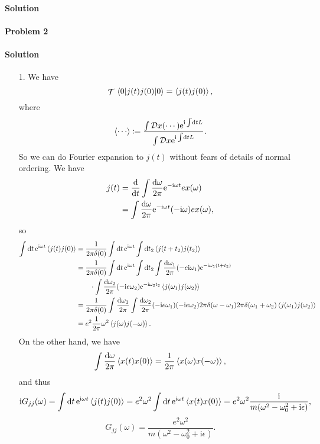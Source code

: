 \documentclass[hyperref, a4paper]{article}
\DeclareMathOperator{\timeorder}{\mathcal{T}}
\newcommand*{\ii}{\mathrm{i}}
\newcommand*{\ee}{\mathrm{e}}
\newcommand*{\fd}[1]{\mathcal{D} #1}
\begin{document}
\paragraph{Solution} 

\paragraph{Problem 2}

\paragraph{Solution} \begin{itemize}
\item[1.] We have 
\[
    \timeorder \expval{j(t) j(0)}{0} = \expval{j(t) j(0)} ,
\]
where 
\[
    \expval{\cdots} \coloneqq 
    \frac{\int \fd{x} (\cdots) \ee^{\ii \int \dd{t} L}}{\int \fd{x} \ee^{\ii \int \dd{t} L}}.
\]
So we can do Fourier expansion to $j(t)$ without fears of details of normal ordering.
We have 
\[
    \begin{aligned}
        j(t) &= \dv{t} \int \frac{\dd{\omega}}{2\pi} \ee^{- \ii \omega t} e x(\omega) \\
        &= \int \frac{\dd{\omega}}{2\pi} \ee^{- \ii \omega t}
        (- \ii \omega) e x(\omega),
    \end{aligned}
\]
so 
\[
    \begin{aligned}
        \int \dd{t} \ee^{\ii \omega t} \expval{j(t) j(0)} &= 
        \frac{1}{2\pi \delta(0)} \int \dd{t} \ee^{\ii \omega t} \int \dd{t_2}
        \expval{j(t + t_2) j(t_2)} \\
        &= \frac{1}{2\pi \delta(0)} \int \dd{t} \ee^{\ii \omega t} \int \dd{t_2}
        \int \frac{\dd{\omega_1}}{2\pi} (- e \ii \omega_1) \ee^{- \ii \omega_1 (t + t_2)} \\
        &\quad \quad \cdot \int \frac{\dd{\omega_2}}{2\pi} (- \ii e \omega_2) \ee^{- \ii \omega_2 t_2}
        \expval{j(\omega_1) j(\omega_2)} \\
        &= \frac{1}{2\pi \delta(0)} \int \frac{\dd{\omega_1}}{2\pi} \int \frac{\dd{\omega_2}}{2\pi}
        (- \ii e \omega_1) (- \ii e \omega_2) 
        2\pi \delta (\omega - \omega_1) 2\pi \delta (\omega_1 + \omega_2) 
        \expval{j(\omega_1) j(\omega_2)} \\
        &= e^2 \frac{1}{2\pi} \omega^2 \expval{j(\omega) j(- \omega)}.
    \end{aligned}
\]
On the other hand, we have 
\[
    \int \frac{\dd{\omega}}{2\pi} \expval{x(t) x(0)} 
    = \frac{1}{2\pi} \expval{x(\omega) x(-\omega)},
\]
and thus 
\begin{equation}
    \ii G_{jj}(\omega) = \int \dd{t} \ee^{\ii \omega t} \expval{j(t) j(0)} = 
    e^2 \omega^2 \int \dd{t} \ee^{\ii \omega t} \expval{x(t) x(0)}
    = e^2 \omega^2 \frac{\ii}{m (\omega^2 - \omega_0^2 + \ii \epsilon)},
\end{equation}
\begin{equation}
    G_{jj}(\omega) = \frac{e^2 \omega^2}{m (\omega^2 - \omega_0^2 + \ii \epsilon)}.
\end{equation}


\end{itemize}
\end{document}
